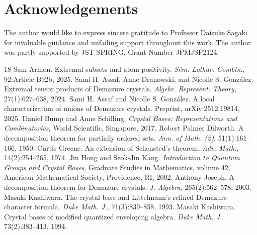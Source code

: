 \documentclass[reqno]{amsart}
\theoremstyle{definition}
\theoremstyle{remark}
\numberwithin{equation}{section}
\begin{document}
	\section*{Acknowledgements}
	The author would like to express sincere gratitude to Professor Daisuke Sagaki
	for invaluable guidance and unfailing support throughout this work.
	The author was partly supported by JST SPRING, Grant Number JPMJSP2124.
	
	\renewcommand{\refname}{References}
	\begin{thebibliography}{18}
		Sam Armon. Extremal subsets and atom-positivity. \textit{Sém. Lothar. Combin.}, 92:Article B92b, 2025.
		Sami H. Assaf, Anne Dranowski, and Nicolle S. González. Extremal tensor products of Demazure crystals. \textit{Algebr. Represent. Theory}, 27(1):627--638, 2024.
		Sami H. Assaf and Nicolle S. González. A local characterization of unions of Demazure crystals. Preprint, arXiv:2512.19814, 2025.
		Daniel Bump and Anne Schilling. \textit{Crystal Bases: Representations and Combinatorics}, World Scientific, Singapore, 2017.
		Robert Palmer Dilworth. A decomposition theorem for partially ordered sets. \textit{Ann. of Math. (2)}, 51(1):161--166, 1950.
		Curtis Greene. An extension of Schensted's theorem. \textit{Adv. Math.}, 14(2):254--265, 1974.
		Jin Hong and Seok-Jin Kang. \textit{Introduction to Quantum Groups and Crystal Bases}, Graduate Studies in Mathematics, volume 42, American Mathematical Society, Providence, RI, 2002.
		Anthony Joseph. A decomposition theorem for Demazure crystals. \textit{J. Algebra}, 265(2):562--578, 2003.
		Masaki Kashiwara. The crystal base and Littelmann's refined Demazure character formula. \textit{Duke Math. J.}, 71(3):839--858, 1993.
		Masaki Kashiwara. Crystal bases of modified quantized enveloping algebra. \textit{Duke Math. J.}, 73(2):383--413, 1994.

\end{thebibliography}
\end{document}
